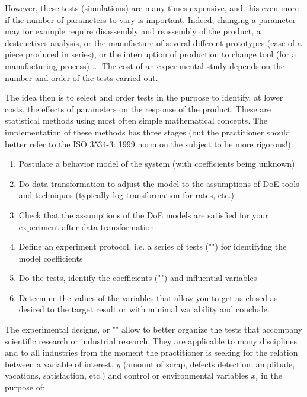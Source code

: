 	However, these tests (simulations) are many times expensive, and this even more if the number of parameters to vary is important. Indeed, changing a parameter may for example require disassembly and reassembly of the product, a destructives analysis, or the manufacture of several different prototypes (case of a piece produced in series), or the interruption of production to change tool (for a manufacturing process) ... The cost of an experimental study depends on the number and order of the tests carried out.

	The idea then is to select and order tests in the purpose to identify, at lower costs, the effects of parameters on the response of the product. These are statistical methods using most often simple mathematical concepts. The implementation of these methods has three stages (but the practitioner should better refer to the ISO 3534-3: 1999 norm on the subject to be more rigorous!):
	\begin{enumerate}
		\item Postulate a behavior model of the system (with coefficients being unknown)
		
		\item Do data transformation to adjust the model to the assumptions of DoE tools and techniques (typically log-transformation for rates, etc.)
		
		\item Check that the assumptions of the DoE models are satisfied for your experiment after data transformation
		
		\item Define an experiment protocol, i.e. a series of tests ("") for identifying the model coefficients
		
		\item Do the tests, identify the coefficients ("") and influential variables
		
		\item Determine the values of the variables that allow you to get as closed as desired to the target result or with minimal variability and conclude.
	\end{enumerate}
	The experimental designs, or "" allow to better organize the tests that accompany scientific research or industrial research. They are applicable to many disciplines and to all industries from the moment the practitioner is seeking for the relation between a variable of interest, $y$ (amount of scrap, defects detection, amplitude, vacations, satisfaction, etc.) and control or environmental variables $x_i$ in the purpose of:
